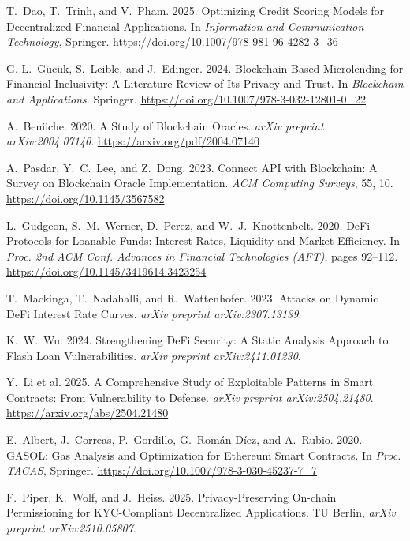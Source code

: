 \documentclass[12pt,a4paper]{report}
\begin{document}
{\begin{enumerate}[label={[\arabic*]}]
\item T.~Dao, T.~Trinh, and V.~Pham. 2025. Optimizing Credit Scoring Models for Decentralized Financial Applications. In \emph{Information and Communication Technology}, Springer. \url{https://doi.org/10.1007/978-981-96-4282-3_36}

\item G.-L.~G\"{u}c\"{u}k, S.~Leible, and J.~Edinger. 2024. Blockchain-Based Microlending for Financial Inclusivity: A Literature Review of Its Privacy and Trust. In \emph{Blockchain and Applications}. Springer. \url{https://doi.org/10.1007/978-3-032-12801-0_22}

\item A.~Beniiche. 2020. A Study of Blockchain Oracles. \emph{arXiv preprint arXiv:2004.07140}. \url{https://arxiv.org/pdf/2004.07140}

\item A.~Pasdar, Y.~C.~Lee, and Z.~Dong. 2023. Connect API with Blockchain: A Survey on Blockchain Oracle Implementation. \emph{ACM Computing Surveys}, 55, 10. \url{https://doi.org/10.1145/3567582}

\item L.~Gudgeon, S.~M.~Werner, D.~Perez, and W.~J.~Knottenbelt. 2020. DeFi Protocols for Loanable Funds: Interest Rates, Liquidity and Market Efficiency. In \emph{Proc. 2nd ACM Conf. Advances in Financial Technologies (AFT)}, pages 92--112. \url{https://doi.org/10.1145/3419614.3423254}

\item T.~Mackinga, T.~Nadahalli, and R.~Wattenhofer. 2023. Attacks on Dynamic DeFi Interest Rate Curves. \emph{arXiv preprint arXiv:2307.13139}.

\item K.~W.~Wu. 2024. Strengthening DeFi Security: A Static Analysis Approach to Flash Loan Vulnerabilities. \emph{arXiv preprint arXiv:2411.01230}.

\item Y.~Li et al. 2025. A Comprehensive Study of Exploitable Patterns in Smart Contracts: From Vulnerability to Defense. \emph{arXiv preprint arXiv:2504.21480}. \url{https://arxiv.org/abs/2504.21480}

\item E.~Albert, J.~Correas, P.~Gordillo, G.~Rom\'{a}n-D\'{i}ez, and A.~Rubio. 2020. GASOL: Gas Analysis and Optimization for Ethereum Smart Contracts. In \emph{Proc. TACAS}, Springer. \url{https://doi.org/10.1007/978-3-030-45237-7_7}

\item F.~Piper, K.~Wolf, and J.~Heiss. 2025. Privacy-Preserving On-chain Permissioning for KYC-Compliant Decentralized Applications. TU Berlin, \emph{arXiv preprint arXiv:2510.05807}.


\end{enumerate}}
\end{document}
